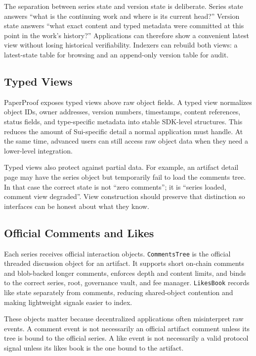 \documentclass[journal]{IEEEtran}
\newcommand{\commentstree}{\texttt{CommentsTree}}
\newcommand{\likesbook}{\texttt{LikesBook}}
\begin{document}
The separation between series state and version state is deliberate. Series state answers ``what is the continuing work and where is its current head?'' Version state answers ``what exact content and typed metadata were committed at this point in the work's history?'' Applications can therefore show a convenient latest view without losing historical verifiability. Indexers can rebuild both views: a latest-state table for browsing and an append-only version table for audit.

\subsection{Typed Views}

PaperProof exposes typed views above raw object fields. A typed view normalizes object IDs, owner addresses, version numbers, timestamps, content references, status fields, and type-specific metadata into stable SDK-level structures. This reduces the amount of Sui-specific detail a normal application must handle. At the same time, advanced users can still access raw object data when they need a lower-level integration.

Typed views also protect against partial data. For example, an artifact detail page may have the series object but temporarily fail to load the comments tree. In that case the correct state is not ``zero comments''; it is ``series loaded, comment view degraded''. View construction should preserve that distinction so interfaces can be honest about what they know.

\subsection{Official Comments and Likes}

Each series receives official interaction objects. \commentstree{} is the official threaded discussion object for an artifact. It supports short on-chain comments and blob-backed longer comments, enforces depth and content limits, and binds to the correct series, root, governance vault, and fee manager. \likesbook{} records like state separately from comments, reducing shared-object contention and making lightweight signals easier to index.

These objects matter because decentralized applications often misinterpret raw events. A comment event is not necessarily an official artifact comment unless its tree is bound to the official series. A like event is not necessarily a valid protocol signal unless its likes book is the one bound to the artifact.
\end{document}
